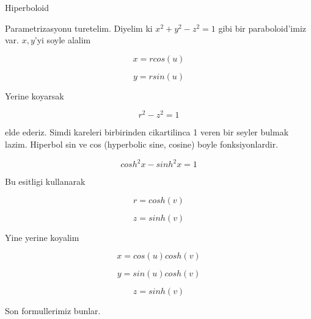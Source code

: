 \documentclass[12pt,fleqn]{article}\usepackage{../common}
\begin{document}
Hiperboloid 

Parametrizasyonu turetelim. Diyelim ki $x^2 + y^2 - z^2 = 1$ gibi bir
paraboloid'imiz var. $x,y$'yi soyle alalim

\[ x = r cos(u) \]

\[ y = r sin(u) \]

Yerine koyarsak

\[ r^2 - z^2 = 1 \]

elde ederiz. Simdi kareleri birbirinden cikartilinca 1 veren bir seyler
bulmak lazim. Hiperbol sin ve cos (hyperbolic sine, cosine) boyle
fonksiyonlardir. 

\[ cosh^2x - sinh^2x = 1 \]

Bu esitligi kullanarak 

\[ r = cosh(v) \]

\[ z = sinh(v) \]

Yine yerine koyalim

\[ x = cos(u)cosh(v) \]

\[ y = sin(u)cosh(v) \]

\[ z = sinh(v) \]

Son formullerimiz bunlar.


\end{document}
